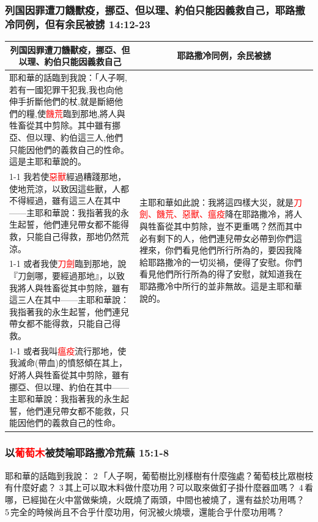 \subsubsection{列国因罪遭刀饑獸疫，挪亞、但以理、約伯只能因義救自己，耶路撒冷同例，但有余民被掳 14:12-23}
\begin{table}[H]
\centering
\begin{tabular}{p{12.25cm}|p{5.0cm}}\hline\hline
\multicolumn{1}{c|}{列国因罪遭刀饑獸疫，挪亞、但以理、約伯只能因義救自己}&\multicolumn{1}{c}{耶路撒冷同例，余民被掳}\\\hline
耶和華的話臨到我說：「人子啊,若有一國犯罪干犯我,我也向他伸手折斷他們的杖,就是斷絕他們的糧,使\textcolor{red}{饑荒}臨到那地,將人與牲畜從其中剪除。其中雖有挪亞、但以理、約伯這三人,他們只能因他們的義救自己的性命。這是主耶和華說的。
&\multirow{4}{5.2cm}{主耶和華如此說：我將這四樣大災，就是\textcolor{red}{刀劍、饑荒、惡獸、瘟疫}降在耶路撒冷，將人與牲畜從其中剪除，豈不更重嗎？然而其中必有剩下的人，他們連兒帶女必帶到你們這裡來，你們看見他們所行所為的，要因我降給耶路撒冷的一切災禍，便得了安慰。你們看見他們所行所為的得了安慰，就知道我在耶路撒冷中所行的並非無故。這是主耶和華說的。}\\\cline{1-1}
我若使\textcolor{red}{惡獸}經過糟踐那地，使地荒涼，以致因這些獸，人都不得經過，雖有這三人在其中——主耶和華說：我指著我的永生起誓，他們連兒帶女都不能得救，只能自己得救，那地仍然荒涼。&\\\cline{1-1}
或者我使\textcolor{red}{刀劍}臨到那地，說『刀劍哪，要經過那地』，以致我將人與牲畜從其中剪除，雖有這三人在其中——主耶和華說：我指著我的永生起誓，他們連兒帶女都不能得救，只能自己得救。&\\\cline{1-1}
或者我叫\textcolor{red}{瘟疫}流行那地，使我滅命(帶血)的憤怒傾在其上，好將人與牲畜從其中剪除，雖有挪亞、但以理、約伯在其中——主耶和華說：我指著我的永生起誓，他們連兒帶女都不能救，只能因他們的義救自己的性命。&\\\hline
\end{tabular}
\end{table}

\subsubsection{以\textcolor{red}{葡萄木}被焚喻耶路撒冷荒蕪 15:1-8}
耶和華的話臨到我說： 2 「人子啊，葡萄樹比別樣樹有什麼強處？葡萄枝比眾樹枝有什麼好處？ 3 其上可以取木料做什麼功用？可以取來做釘子掛什麼器皿嗎？ 4 看哪，已經拋在火中當做柴燒，火既燒了兩頭，中間也被燒了，還有益於功用嗎？ 5 完全的時候尚且不合乎什麼功用，何況被火燒壞，還能合乎什麼功用嗎？ 

